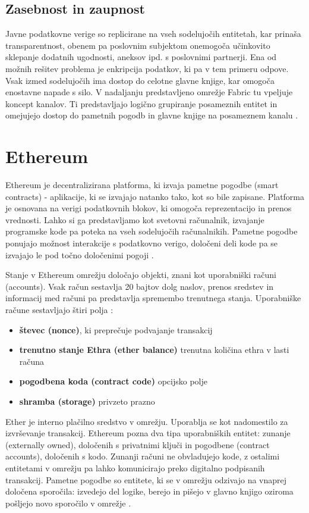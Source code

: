 \documentclass[a4paper, 12pt]{book}
\begin{document}
\subsection{Zasebnost in zaupnost}
Javne podatkovne verige so replicirane na vseh sodelujočih entitetah, kar prinaša transparentnost, obenem pa poslovnim subjektom onemogoča učinkovito sklepanje dodatnih ugodnosti, aneksov ipd. s poslovnimi partnerji.
Ena od možnih rešitev problema je enkripcija podatkov, ki pa v tem primeru odpove.
Vsak izmed sodelujočih ima dostop do celotne glavne knjige, kar omogoča enostavne napade s silo.
V nadaljanju predstavljeno omrežje Fabric tu vpeljuje koncept kanalov.
Ti predstavljajo logično grupiranje posameznih entitet in omejujejo dostop do pametnih pogodb in glavne knjige na posameznem kanalu \cite{hyperledgerDocs}.

\section{Ethereum}
Ethereum je decentralizirana platforma, ki izvaja pametne pogodbe (smart contracts) - aplikacije, ki se izvajajo natanko tako, kot so bile zapisane.
Platforma je osnovana na verigi podatkovnih blokov, ki omogoča reprezentacijo in prenos vrednosti.
Lahko si ga predstavljamo kot svetovni računalnik, izvajanje programske kode pa poteka na vseh sodelujočih računalnikih.
Pametne pogodbe ponujajo možnost interakcije s podatkovno verigo, določeni deli kode pa se izvajajo le pod točno določenimi pogoji \cite{ethereumWhitepaper}.

Stanje v Ethereum omrežju določajo objekti, znani kot uporabniški računi (accounts).
Vsak račun sestavlja 20 bajtov dolg naslov, prenos sredstev in informacij med računi pa predstavlja spremembo trenutnega stanja.
Uporabniške račune sestavljajo štiri polja \cite{ethereumWhitepaper}:
\begin{itemize}
\item \textbf{števec (nonce)}, ki preprečuje podvajanje transakcij
\item \textbf{trenutno stanje Ethra (ether balance)} trenutna količina ethra v lasti računa
\item \textbf{pogodbena koda (contract code)} opcijsko polje
\item \textbf{shramba (storage)} privzeto prazno
\end{itemize}

Ether je interno plačilno sredstvo v omrežju.
Uporablja se kot nadomestilo za izvrševanje transakcij.
Ethereum pozna dva tipa uporabniških entitet: zunanje (externally owned), določenih s privatnimi ključi in pogodbene (contract accounts), določenih s kodo.
Zunanji računi ne obvladujejo kode, z ostalimi entitetami v omrežju pa lahko komunicirajo preko digitalno podpisanih transakcij.
Pametne pogodbe so entitete, ki se v omrežju odzivajo na vnaprej določena sporočila: izvedejo del logike, berejo in pišejo v glavno knjigo oziroma pošljejo novo sporočilo v omrežje \cite{ethereumWhitepaper}.
\end{document}
